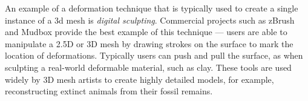 





An example of a deformation technique that is typically used to create a single instance of a 3d mesh is \emph{digital sculpting}. Commercial projects such as zBrush\cite{zBrush} and Mudbox\cite{Mudbox} provide the best example of this technique --- users are able to manipulate a 2.5D or 3D mesh by drawing strokes on the surface to mark the location of deformations. Typically users can push and pull the surface, as when sculpting a real-world deformable material, such as clay. These tools are used widely by 3D mesh artists to create highly detailed models, for example, reconstructing extinct animals from their fossil remains\cite{Steyer10}.





